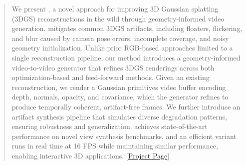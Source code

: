 \begin{abstract}
We present \ours, a novel approach for improving 3D Gaussian splatting (3DGS) reconstructions in the wild through geometry-informed video generation. \ours mitigates common 3DGS artifacts, including floaters, flickering, and blur caused by camera pose errors, incomplete coverage, and noisy geometry initialization. Unlike prior RGB-based approaches limited to a single reconstruction pipeline, our method introduces a geometry-informed video-to-video generator that refines 3DGS renderings across both optimization-based and feed-forward methods. Given an existing reconstruction, we render a Gaussian primitives video buffer encoding depth, normals, opacity, and covariance, which the generator refines to produce temporally coherent, artifact-free frames. We further introduce an artifact synthesis pipeline that simulates diverse degradation patterns, ensuring robustness and generalization. \ours achieves state-of-the-art performance on novel view synthesis benchmarks, and an efficient variant runs in real time at 16 FPS while maintaining similar performance, enabling interactive 3D applications.  [\href{http://research.zhuliyuan.net/projects/GaussFusion/}{Project Page}]





\end{abstract}